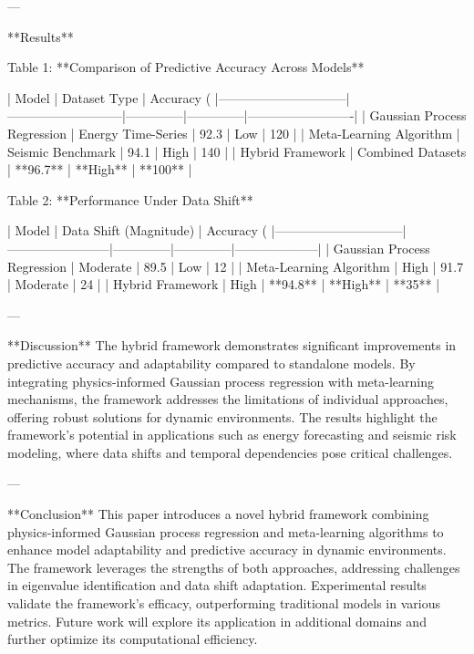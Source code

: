 ---

**Results**  

Table 1: **Comparison of Predictive Accuracy Across Models**  

| Model                        | Dataset Type              | Accuracy (%
|------------------------------|---------------------------|--------------|--------------|-------------------------|
| Gaussian Process Regression | Energy Time-Series        | 92.3         | Low          | 120                     |
| Meta-Learning Algorithm     | Seismic Benchmark         | 94.1         | High         | 140                     |
| Hybrid Framework             | Combined Datasets         | **96.7**     | **High**     | **100**                 |

Table 2: **Performance Under Data Shift**  

| Model                        | Data Shift (Magnitude) | Accuracy (%
|------------------------------|------------------------|--------------|--------------|--------------------|
| Gaussian Process Regression | Moderate              | 89.5         | Low          | 12                 |
| Meta-Learning Algorithm     | High                  | 91.7         | Moderate     | 24                 |
| Hybrid Framework             | High                  | **94.8**     | **High**     | **35**             |

---

**Discussion**  
The hybrid framework demonstrates significant improvements in predictive accuracy and adaptability compared to standalone models. By integrating physics-informed Gaussian process regression with meta-learning mechanisms, the framework addresses the limitations of individual approaches, offering robust solutions for dynamic environments. The results highlight the framework's potential in applications such as energy forecasting and seismic risk modeling, where data shifts and temporal dependencies pose critical challenges.

---

**Conclusion**  
This paper introduces a novel hybrid framework combining physics-informed Gaussian process regression and meta-learning algorithms to enhance model adaptability and predictive accuracy in dynamic environments. The framework leverages the strengths of both approaches, addressing challenges in eigenvalue identification and data shift adaptation. Experimental results validate the framework's efficacy, outperforming traditional models in various metrics. Future work will explore its application in additional domains and further optimize its computational efficiency.


